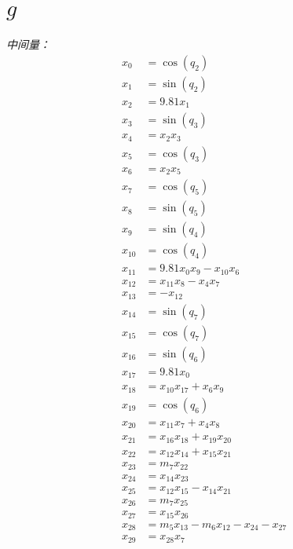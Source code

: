 \documentclass[11pt]{article}
\begin{document}

\section*{$g$}

\textit{中间量：}
\begin{align*}
x_{0} &= \cos{\left(q_{2} \right)} \\
x_{1} &= \sin{\left(q_{2} \right)} \\
x_{2} &= 9.81 x_{1} \\
x_{3} &= \sin{\left(q_{3} \right)} \\
x_{4} &= x_{2} x_{3} \\
x_{5} &= \cos{\left(q_{3} \right)} \\
x_{6} &= x_{2} x_{5} \\
x_{7} &= \cos{\left(q_{5} \right)} \\
x_{8} &= \sin{\left(q_{5} \right)} \\
x_{9} &= \sin{\left(q_{4} \right)} \\
x_{10} &= \cos{\left(q_{4} \right)} \\
x_{11} &= 9.81 x_{0} x_{9} - x_{10} x_{6} \\
x_{12} &= x_{11} x_{8} - x_{4} x_{7} \\
x_{13} &= - x_{12} \\
x_{14} &= \sin{\left(q_{7} \right)} \\
x_{15} &= \cos{\left(q_{7} \right)} \\
x_{16} &= \sin{\left(q_{6} \right)} \\
x_{17} &= 9.81 x_{0} \\
x_{18} &= x_{10} x_{17} + x_{6} x_{9} \\
x_{19} &= \cos{\left(q_{6} \right)} \\
x_{20} &= x_{11} x_{7} + x_{4} x_{8} \\
x_{21} &= x_{16} x_{18} + x_{19} x_{20} \\
x_{22} &= x_{12} x_{14} + x_{15} x_{21} \\
x_{23} &= m_{7} x_{22} \\
x_{24} &= x_{14} x_{23} \\
x_{25} &= x_{12} x_{15} - x_{14} x_{21} \\
x_{26} &= m_{7} x_{25} \\
x_{27} &= x_{15} x_{26} \\
x_{28} &= m_{5} x_{13} - m_{6} x_{12} - x_{24} - x_{27} \\
x_{29} &= x_{28} x_{7} \\

\end{align*}
\end{document}
